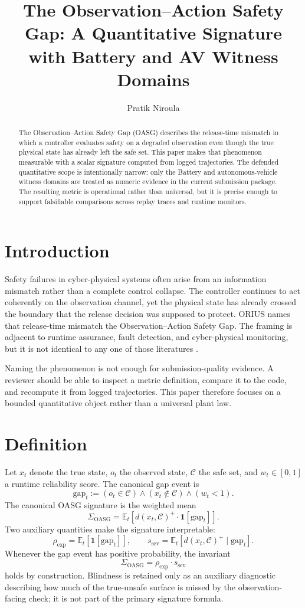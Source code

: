 \documentclass[conference]{IEEEtran}
\title{The Observation--Action Safety Gap: A Quantitative Signature with Battery and AV Witness Domains}
\author{Pratik Niroula}
\begin{document}
\maketitle

\begin{abstract}
The Observation--Action Safety Gap (OASG) describes the release-time mismatch in which a controller evaluates safety on a degraded observation even though the true physical state has already left the safe set. This paper makes that phenomenon measurable with a scalar signature computed from logged trajectories. The defended quantitative scope is intentionally narrow: only the Battery and autonomous-vehicle witness domains are treated as numeric evidence in the current submission package. The resulting metric is operational rather than universal, but it is precise enough to support falsifiable comparisons across replay traces and runtime monitors.
\end{abstract}

\section{Introduction}
Safety failures in cyber-physical systems often arise from an information mismatch rather than a complete control collapse. The controller continues to act coherently on the observation channel, yet the physical state has already crossed the boundary that the release decision was supposed to protect. ORIUS names that release-time mismatch the Observation--Action Safety Gap. The framing is adjacent to runtime assurance, fault detection, and cyber-physical monitoring, but it is not identical to any one of those literatures \cite{sha1998simplex,sha2001using,pasqualetti2013attack,basseville1993detection}.

Naming the phenomenon is not enough for submission-quality evidence. A reviewer should be able to inspect a metric definition, compare it to the code, and recompute it from logged trajectories. This paper therefore focuses on a bounded quantitative object rather than a universal plant law.

\section{Definition}
Let $x_t$ denote the true state, $o_t$ the observed state, $\mathcal{C}$ the safe set, and $w_t \in [0,1]$ a runtime reliability score. The canonical gap event is
\[
\mathrm{gap}_t := (o_t \in \mathcal{C}) \wedge (x_t \notin \mathcal{C}) \wedge (w_t < 1).
\]
The canonical OASG signature is the weighted mean
\[
\Sigma_{\mathrm{OASG}} = \mathbb{E}_t \left[d(x_t,\mathcal{C})^+ \cdot \mathbf{1}[\mathrm{gap}_t]\right].
\]
Two auxiliary quantities make the signature interpretable:
\[
\rho_{\mathrm{exp}} = \mathbb{E}_t[\mathbf{1}[\mathrm{gap}_t]],
\qquad
s_{\mathrm{sev}} = \mathbb{E}_t[d(x_t,\mathcal{C})^+ \mid \mathrm{gap}_t].
\]
Whenever the gap event has positive probability, the invariant
\[
\Sigma_{\mathrm{OASG}} = \rho_{\mathrm{exp}} \cdot s_{\mathrm{sev}}
\]
holds by construction. Blindness is retained only as an auxiliary diagnostic describing how much of the true-unsafe surface is missed by the observation-facing check; it is not part of the primary signature formula.
\end{document}
